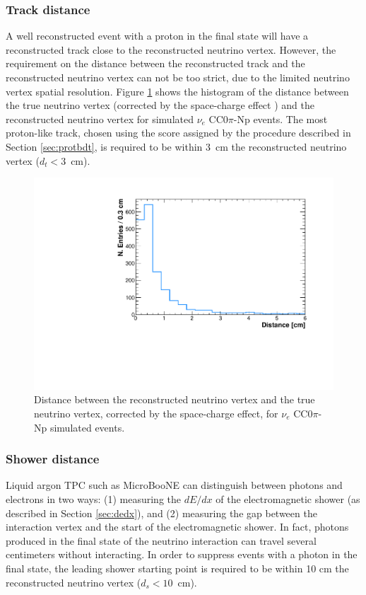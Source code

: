 \subsubsection{Track distance}
A well reconstructed event with a proton in the final state will have a reconstructed track close to the reconstructed neutrino vertex. However, the requirement on the distance between the reconstructed track and the reconstructed neutrino vertex can not be too strict, due to the limited neutrino vertex spatial resolution. Figure \ref{fig:dist} shows the histogram of the distance between the true neutrino vertex (corrected by the space-charge effect \cite{sce}) and the reconstructed neutrino vertex for simulated $\nu_{e}$ CC0$\pi$-Np events. The most proton-like track, chosen using the score assigned by the procedure described in Section \ref{sec:protbdt}, is required to be within 3~cm the reconstructed neutrino vertex ($d_t < 3$~cm).

\begin{figure}[htbp]
\centering
  \includegraphics[width=0.7\linewidth]{figures/dist.pdf}
  \caption{Distance between the reconstructed neutrino vertex and the true neutrino vertex, corrected by the space-charge effect, for $\nu_{e}$ CC0$\pi$-Np simulated events.}\label{fig:dist}
\end{figure}

\subsubsection{Shower distance}
Liquid argon TPC such as MicroBooNE can distinguish between photons and electrons in two ways: (1) measuring the $dE/dx$ of the electromagnetic shower (as described in Section \ref{sec:dedx}), and (2) measuring the gap between the interaction vertex and the start of the electromagnetic shower. In fact, photons produced in the final state of the neutrino interaction can travel several centimeters without interacting. In order to suppress events with a photon in the final state, the leading shower starting point is required to be within 10 cm  the reconstructed neutrino vertex ($d_{s} < 10$~cm).

